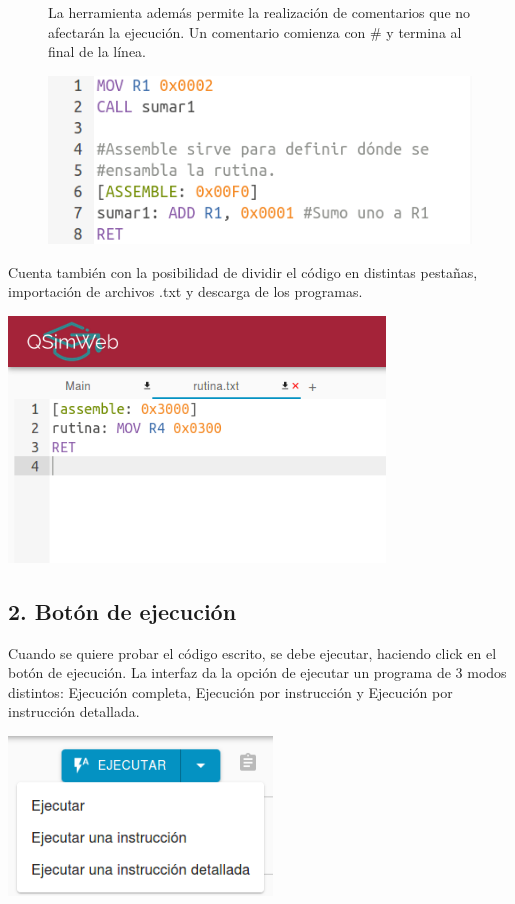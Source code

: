 \begin{figure}[H]
  La herramienta además permite la realización de comentarios que no afectarán la ejecución. Un comentario comienza con \# y termina al final de la línea.
  \begin{center}
    \includegraphics[scale=0.6]{./figuras/comentarios.png}
  \end{center}
  \label{fig:comentarios}
\end{figure}

\begin{samepage}
  Cuenta también con la posibilidad de dividir el código en distintas pestañas, importación de archivos .txt y descarga de los programas.
  
  \begin{center}
    \includegraphics[width=10cm]{figuras/editor_tab.PNG}
  \end{center}
\end{samepage}

\subsection*{2. Botón de ejecución}
Cuando se quiere probar el código escrito, se debe ejecutar, haciendo click en el botón de ejecución.
La interfaz da la opción de ejecutar un programa de 3 modos distintos: Ejecución completa, Ejecución por instrucción y Ejecución por instrucción detallada. 
\begin{center}
  \includegraphics[width=7cm]{figuras/boton_ejecucion.png}
  \label{fig:boton-ejecucion}
\end{center}

